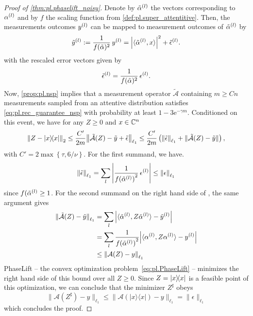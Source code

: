 \begin{proof}[Proof of \cref{thm:pl.phaselift_noisy}]
  Denote by $\tilde\alpha^{(l)}$ the vectors corresponding to $\alpha^{(l)}$ and by $f$ the scaling function from \cref{def:pl.super_attentitive}.
  Then, the measurements outcomes $y^{(l)}$ can be mapped to measurement outcomes of $\tilde\alpha^{(l)}$ by
  \[
    \label{eq:pl.phaselift_noisy_recr.unnormalized_measurements}
    \tilde y^{(l)}
    := \frac{1}{f(\tilde\alpha)^{2}} \, y^{(l)}
    = {\left\vert\braket{\tilde\alpha^{(l)}, x}\right\vert}^2 + \tilde\epsilon^{(l)}.
  \]
  with the rescaled error vectors given by
  \[
    \tilde\epsilon^{(l)} = \frac{1}{f(\tilde\alpha)^{2}} \, \epsilon^{(l)}.
  \]
  Now, \cref{prop:pl.nsp} implies that a measurement operator $\tilde{\mathcal{A}}$ containing $m \geq C n$ measurements sampled from an attentive distribution satisfies \cref{eq:pl.rec_guarantee_nsp} with probability at least $1-3 \mathrm{e}^{-\gamma m}$.
  Conditioned on this event, we have for any $Z \ge 0$ and $x \in {\mathbb{C}}^n$
  \[
    \Fnorm{Z - \ketbra{x}}
    \le \frac{C'}{2m} \Norm{\tilde{\mathcal{A}}(Z) - \tilde y + \tilde \epsilon}_{\ell_1}
    \le \frac{C'}{2m} \left( \norm{\tilde \epsilon}_{\ell_1} + \norm{\tilde{\mathcal{A}}(Z) - \tilde y} \right),
    \label{eq:phaselift_noisy_recr.findal_bound}
  \]
  with $C' = 2 \max \left\{\tau, 6/\nu \right\}$.
  For the first summand, we have.
  \[
    {\Vert\tilde\epsilon\Vert}_{\ell_1}  = \sum_l {\left\vert  \frac{1}{{f(\tilde\alpha^{(l)})}^2} \, \epsilon^{(l)}\right\vert} \le {\Vert\epsilon\Vert}_{\ell_1}
  \]
  since $f(\tilde\alpha^{(l)} \ge 1$.
  For the second summand on the right hand side of , the same argument gives
  \begin{align}
    {\Vert\tilde{\mathcal{A}}(Z) - \tilde y\Vert}_{\ell_1}
    &= \sum_l {\left\vert  \braket{\tilde\alpha^{(l)}, Z \tilde\alpha^{(l)}} - \tilde y^{(l)}  \right\vert} \\
    &= \sum_l \frac{1}{{f(\tilde\alpha^{(l)})}^2}  {\left\vert \braket{\alpha^{(l)}, Z \alpha^{(l)}} - y^{(l)}  \right\vert} \\
    &\le {\Vert\mathcal{A}(Z) - y\Vert}_{\ell_1}
  \end{align}
  PhaseLift -- the convex optimization problem~\eqref{eq:pl.PhaseLift} -- minimizes the right hand side of this bound over all $Z \geq 0$.
  Since $Z = \ketbra{x}$ is a feasible point of this optimization, we can conclude that the minimizer $Z^\sharp$ obeys
  \[
    \| \mathcal{A}( Z^\sharp) - {y} \|_{\ell_1} \leq \| \mathcal{A}(|{x} \rangle \! \langle {x}|)-{y} \|_{\ell_1} = \| {\epsilon} \|_{\ell_1}
  \]
  which concludes the proof.
\end{proof}

